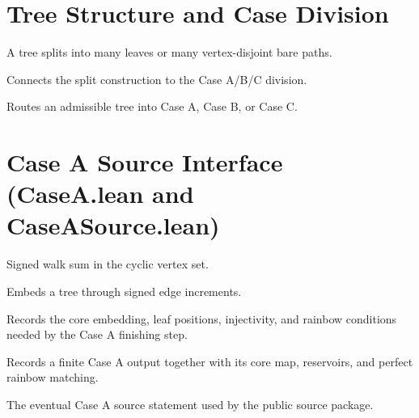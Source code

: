 \chapter{Tree Structure and Case Division}

\begin{theorem}\label{thm:split}
\leanok
A tree splits into many leaves or many vertex-disjoint bare paths.
\end{theorem}

\begin{theorem}\label{thm:tree_split_via_split}
\leanok
Connects the split construction to the Case A/B/C division.
\end{theorem}

\begin{theorem}\label{thm:case_division}
\leanok
Routes an admissible tree into Case A, Case B, or Case C.
\end{theorem}

\chapter{Case A Source Interface (CaseA.lean and CaseASource.lean)}

\begin{definition}\label{def:walkSum}
\leanok
Signed walk sum in the cyclic vertex set.
\end{definition}

\begin{lemma}\label{lem:tree_embed}
\leanok
Embeds a tree through signed edge increments.
\end{lemma}

\begin{definition}\label{def:valid_caseA_embedding}
\leanok
Records the core embedding, leaf positions, injectivity, and rainbow conditions needed by the
Case A finishing step.
\end{definition}

\begin{definition}\label{def:caseA_joint_output}
\leanok
Records a finite Case A output together with its core map, reservoirs, and perfect rainbow
matching.
\end{definition}

\begin{theorem}\label{thm:caseA_source}
The eventual Case A source statement used by the public source package.
\end{theorem}

